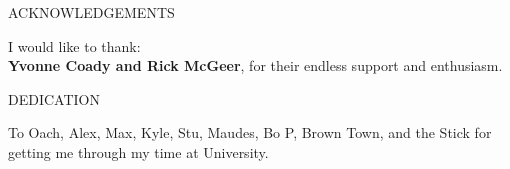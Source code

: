 

\tableofcontents
{}\listoftables
\setcounter{lofdepth}{2}
\listoffigures

%
%
\newpage
{}

\begin{center}
ACKNOWLEDGEMENTS
\end{center}

\noindent I would like to thank: \\
\textbf{Yvonne Coady and Rick McGeer}, for their endless support and enthusiasm. \\



%
%
\newpage
{}

\begin{center}
DEDICATION
\end{center}

\begin{center}
To Oach, Alex, Max, Kyle, Stu, Maudes, Bo P, Brown Town, and the Stick for getting me through my time at University.
\end{center}


\newpage
\pagestyle{myheadings}
